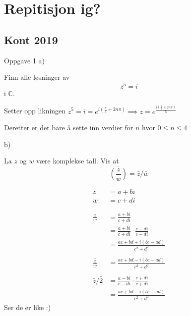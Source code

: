 \documentclass[11pt, a4paper, norsk]{article}
\begin{document}
            \section{Repitisjon ig?}
            
            \subsection{Kont 2019}%
            \label{sub:kont_2019}
            
            \begin{Example}{Oppgave 1}{}
                a)


                Finn alle løsninger av \[ z^5 = i \] i $\mathbb{C}$.

                Setter opp likningen $z^5 = i = e^{i(\frac{\pi}{2} + 2n\pi)} \implies z = e^{\frac{i(\frac{\pi}{2} + 2n\pi)}{5}}$


                Deretter er det bare å sette inn verdier for $n$ hvor $0 \leq n \leq 4$


                b)


                La $z$ og $w$ være komplekse tall. Vis at \[ \bar{\left(\frac{z}{w}\right)} = \bar{z}/\bar{w} \]

                \begin{align*}
                    z &= a + bi \\
                    w &= c + di \\
                    \\
                    \\
                    \frac{z}{w} &= \frac{a + bi}{c + di}
                    \\
                                &= \frac{a+bi}{c + di} \cdot \frac{c-di}{c-di}
                                \\
                                &= \frac{ac + bd + i(bc - ad)}{c^2 + d^2}
                                \\
                                \\
                    \bar{\frac{z}{w}} &= \frac{ac + bd - i(bc - ad)}{c^2 + d^2}
                    \\
                    \\
                    \bar{z}/\bar{2} &= \frac{a-bi}{c - di} \cdot \frac{c+di}{c+di}
                    \\
                                    &= \frac{ac + bd -i(bc - ad)}{c^2 + d^2}
                \end{align*}
                Ser de er like :)
            \end{Example}
\end{document}
